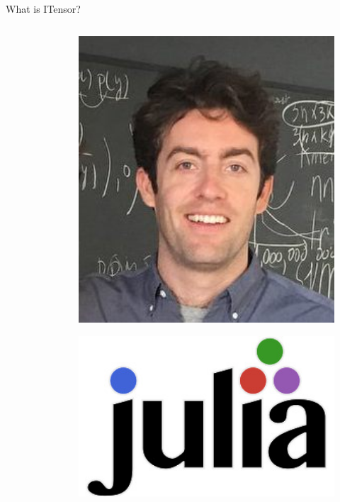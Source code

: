 \begin{frame}{What is ITensor?}
\begin{columns}
\begin{column}[T]{0.3\textwidth}
\begin{columns}
\begin{column}[T]{0.5\textwidth}
      \end{column}

      \begin{column}[T]{0.5\textwidth}%

        \begin{figure}[T]
          \includegraphics[width=1.0\textwidth]{
            slides/assets/what-is-itensor-miles-stoudenmire.jpg
          }
        \end{figure}

        \begin{figure}[T]
          \includegraphics[width=1.0\textwidth]{
            slides/assets/what-is-itensor-julia.jpg
          }
        \end{figure}


\end{column}
\end{columns}
\end{column}
\end{columns}
\end{frame}
